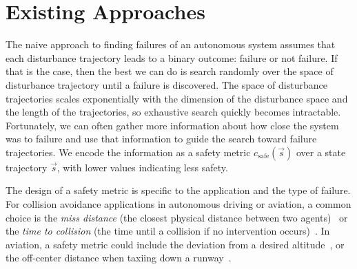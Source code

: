 \section{Existing Approaches}

The naive approach to finding failures of an autonomous system assumes that each disturbance trajectory leads to a binary outcome: failure or not failure. If that is the case, then the best we can do is search randomly over the space of disturbance trajectory until a failure is discovered. The space of disturbance trajectories scales exponentially with the dimension of the disturbance space and the length of the trajectories, so exhaustive search quickly becomes intractable. Fortunately, we can often gather more information about how close the system was to failure and use that information to guide the search toward failure trajectories. We encode the information as a safety metric $c_{\text{safe}}(\vec{s})$ over a state trajectory $\vec{s}$, with lower values indicating less safety. 

The design of a safety metric is specific to the application and the type of failure. For collision avoidance applications in autonomous driving or aviation, a common choice is the \emph{miss distance} (the closest physical distance between two agents)~\cite{lee2015adaptive,koren2018adaptive} or the \emph{time to collision} (the time until a collision if no intervention occurs)~\cite{leung2019backpropagation}. In aviation, a safety metric could include the deviation from a desired altitude~\cite{delmas2019evaluation,ernst2019arch}, or the off-center distance when taxiing down a runway~\cite{julian2020validation}. 
 
